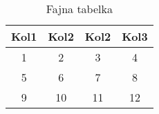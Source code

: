 \begin{table}[htbp]
\centering
\begin{tabular}{||c c c c||} 
 \hline
 Kol1 & Kol2 & Kol2 & Kol3 \\ [0.5ex] 
 \hline\hline
 1 & 2 & 3 & 4 \\ 
 \hline
 5 & 6 & 7 & 8 \\
 \hline
 9 & 10 & 11 & 12 \\
 \hline
\end{tabular}
\label{tab:ala}
\caption{Fajna tabelka}
\end{table}